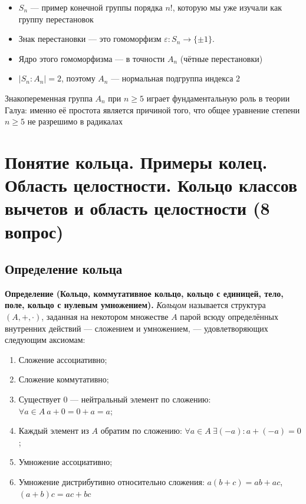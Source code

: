 \documentclass[a4paper,12pt]{article}
\theoremstyle{definition}
\theoremstyle{plain}
\theoremstyle{remark}
\begin{document}
	\begin{tcolorbox}[colback=purple!5, colframe=purple!50!black, title=Заметочка: Связь с предыдущими темами]
		\begin{itemize}
			\item $S_n$ — пример конечной группы порядка $n!$, которую мы уже изучали как группу перестановок
			\item Знак перестановки — это гомоморфизм $\varepsilon \colon S_n \to \{\pm 1\}$.
			\item Ядро этого гомоморфизма — в точности $A_n$ (чётные перестановки)
			\item $|S_n : A_n| = 2$, поэтому $A_n$ — нормальная подгруппа индекса $2$
		\end{itemize}
	\end{tcolorbox}
	
	\begin{tcolorbox}[colback=yellow!5, colframe=orange!60!black, title=Важное замечание]
		Знакопеременная группа $A_n$ при $n \geq 5$ играет фундаментальную роль в теории Галуа: именно её простота является причиной того, что общее уравнение степени $n \geq 5$ не разрешимо в радикалах
	\end{tcolorbox}
	
	
	
	
	
	
	
	\newpage
	\section{Понятие кольца. Примеры колец. Область целостности. Кольцо классов вычетов и область целостности (8 вопрос)}
	
	\subsection{Определение кольца}
	
	\noindent \textbf{Определение (Кольцо, коммутативное кольцо, кольцо с единицей, тело, поле, кольцо с нулевым умножением).}
	\textit{Кольцом} называется структура $(A, +, \cdot)$, заданная на некотором множестве $A$ парой всюду определённых внутренних действий — сложением и умножением, — удовлетворяющих следующим аксиомам:
	\begin{enumerate}
		\item Сложение ассоциативно;
		\item Сложение коммутативно;
		\item Существует $0$ — нейтральный элемент по сложению: $\forall a \in A \ a + 0 = 0 + a = a$;
		\item Каждый элемент из $A$ обратим по сложению: $\forall a \in A \ \exists (-a) \colon a + (-a) = 0$;
		\item Умножение ассоциативно;
		\item Умножение дистрибутивно относительно сложения: $a(b+c) = ab + ac$, $(a+b)c = ac + bc$
	\end{enumerate}
	
\end{document}

